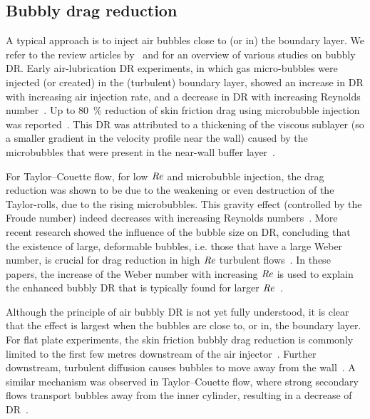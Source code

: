 \subsection{Bubbly drag reduction}
 A typical approach is to inject air bubbles close to (or in) the boundary layer.
We refer to the review articles by~\cite{Ceccio2010} and \cite{Murai2014} for an overview of various studies on bubbly DR.
Early air-lubrication DR experiments, in which gas micro-bubbles were injected (or created) in the (turbulent) boundary layer, showed an increase in DR with increasing air injection rate, and a decrease in DR with increasing Reynolds number~\citep{McCormick1973,Madavan1985,Watanabe1998}. Up to \SI{80}{\percent} reduction of skin friction drag using microbubble injection was reported~\citep{Madavan1984}. This DR was attributed to a thickening of the viscous sublayer (so a smaller gradient in the velocity profile near the wall) caused by the microbubbles that were present in the near-wall buffer layer~\citep{Ceccio2010}.

For Taylor--Couette flow, for low $\mbox{\textit{Re}}$ and microbubble injection, the drag reduction was shown to be due to the weakening or even destruction of the Taylor-rolls, due to the rising microbubbles. This gravity effect (controlled by the Froude number) indeed decreases with increasing Reynolds numbers~\citep{Sugiyama2008,Lohse2018}. More recent research showed the influence of the bubble size on DR, concluding that the existence of large, deformable bubbles, i.e. those that have a large Weber number, is crucial for drag reduction in high $\mbox{\textit{Re}}$ turbulent flows~\citep{Lu2005,vandenBerg2005,vanGils2013,Verschoof2016,Spandan2018}. In these papers, the increase of the Weber number with increasing $\mbox{\textit{Re}}$ is used to explain the enhanced bubbly DR that is typically found for larger $\mbox{\textit{Re}}$~\citep{vandenBerg2005}.

Although the principle of air bubbly DR is not yet fully understood, it is clear that the effect is largest when the bubbles are close to, or in, the boundary layer. For flat plate experiments, the skin friction bubbly drag reduction is commonly limited to the first few metres downstream of the air injector~\citep{Watanabe1998,Sanders2006}. Further downstream, turbulent diffusion causes bubbles to move away from the wall~\citep{Murai2014}. A similar mechanism was observed in Taylor--Couette flow, where strong secondary flows transport bubbles away from the inner cylinder, resulting in a decrease of DR~\citep{vandenBerg2007,Fokoua2015,Verschoof2018}.  \\


